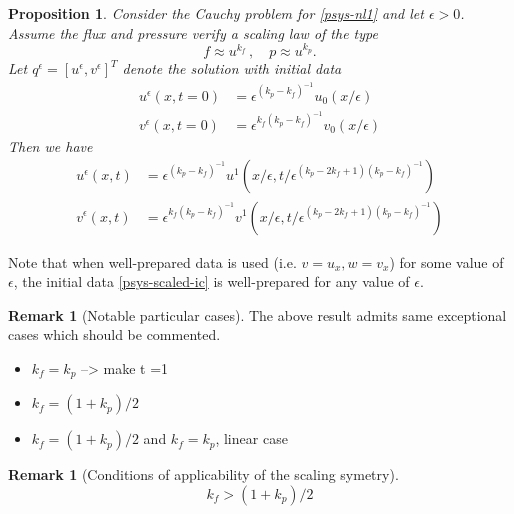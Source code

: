 \documentclass{article}
\theoremstyle{plain}
\newtheorem{proposition}[theorem]{Proposition}
\theoremstyle{definition}
\newtheorem{remark}[theorem]{Remark}
\numberwithin{theorem}{section}
\newcommand{\todo}[1]{{\Large{\color{red}{#1}}}}
\begin{document}
\begin{proposition}
Consider   the Cauchy problem for \eqref{psys-nl1} and  let $\epsilon>0$.
Assume the flux and pressure verify a scaling law   of the type 
$$
f  \approx u^{k_f}\,,\quad p \approx u^{k_p}.
$$
Let $q^\epsilon=[u^\epsilon,v^\epsilon]^T$ denote the
solution   with initial data
\begin{subequations} \label{psys-scaled-ic}
\begin{align}
    u^\epsilon(x,t=0) & = \epsilon^{(k_p - k_f)^{-1}} u_0(x/\epsilon) \\
    v^\epsilon(x,t=0) & = \epsilon^{k_f(k_p - k_f)^{-1}} v_0(x/\epsilon)
\end{align}
\end{subequations}
Then we have
\begin{subequations} \label{psys-scaled-ic-2}
\begin{align}
    u^{\epsilon}(x,t) & = \epsilon^{(k_p - k_f)^{-1}} u^1(x/\epsilon, t/\epsilon^{(k_p - 2k_f  + 1) (k_p - k_f)^{-1} } ) \\
    v^{\epsilon}(x,t) & =  \epsilon^{k_f(k_p - k_f)^{-1}} v^1(x/\epsilon, t/\epsilon^{(k_p - 2k_f  + 1) (k_p - k_f)^{-1} } )
\end{align}
\end{subequations}
\end{proposition}
Note that when well-prepared data is used (i.e. $v=u_x, w = v_x$) for some value of
$\epsilon$, the initial data \eqref{psys-scaled-ic} is well-prepared for any value of $\epsilon$.


\begin{remark}[Notable particular cases] The above result  admits same exceptional cases which should be commented.
\begin{itemize}
\item $k_f=k_p$ --> make t =1
\item  $k_f=(1+k_p)/2$  
\item  $k_f=(1+k_p)/2$ and $k_f=k_p$, linear case
\end{itemize}
\end{remark}

\todo{COmplete remark: case 1 need to make $n_t$ = 1 and revert the scaling with $x$ not scaling. case 2:  does not scale. case 3: no interest. }

\begin{remark}[Conditions of applicability of the scaling symetry] 
$$
k_f > (1+k_p)/2 
$$
\end{remark}
\todo{COmplete remark: the condition allows to decrease tau when taking larger data, and vice versa}
\end{document}
